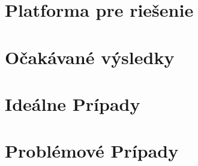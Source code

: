 \section{Platforma pre riešenie}
\section{Očakávané výsledky}
\section{Ideálne Prípady}
\section{Problémové Prípady}
